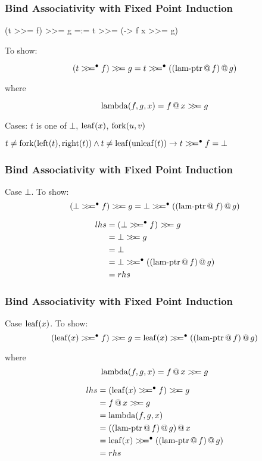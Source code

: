 \documentclass[serif,professionalfont]{beamer}
\begin{document}
\newcommand\lamptr[2]{(\appp{\app{\ptr{lam}}{#1}}{#2})}

\begin{frame}[fragile]
\frametitle{Bind Associativity with Fixed Point Induction}

\begin{code}
(t >>= f) >>= g =:= t >>= (\x -> f x >>= g)
\end{code}


To show:

$$\bind{(\bindb{t}{f})}{g} = \bindb{t}{\lamptr{f}{g}}$$

where

$$\mathrm{lambda}(f,g,x) = f \, @ \, x >\!\!>\!\!= g$$

\pause

\vspace{2\baselineskip}

Cases: $t$ is one of $\bot$, $\mathrm{leaf}(x)$, $\mathrm{fork}(u,v)$
\pause

\vspace{2\baselineskip}

$t \neq \mathrm{fork}(\mathrm{left}(t),\mathrm{right}(t)) \wedge t \neq\mathrm{leaf}(\mathrm{unleaf}(t)) \rightarrow t >\!\!>\!\!=^{\bullet} f = \bot$

\end{frame}

\begin{frame}[fragile]
\frametitle{Bind Associativity with Fixed Point Induction}

Case $\bot$. To show:
$$\bind{(\bindb{\bot}{f})}{g} = \bindb{\bot}{\lamptr{f}{g}}$$

\begin{align*}
lhs = & \; \bind{(\bindb{\bot}{f})}{g} \\
    = & \; \bind{\bot}{g}              \\
    = & \; \bot                        \\
    = & \; \bindb{\bot}{\lamptr{f}{g}} \\
    = & \; rhs
\end{align*}

\end{frame}

\begin{frame}[fragile]
\frametitle{Bind Associativity with Fixed Point Induction}

Case $\mathrm{leaf}(x)$. To show:
$$\bind{(\bindb{\leaf{x}}{f})}{g} = \bindb{\leaf{x}}{\lamptr{f}{g}}$$

where
$$\mathrm{lambda}(f,g,x) = f \, @ \, x >\!\!>\!\!= g$$

\begin{align*}
lhs = & \; \bind{(\bindb{\leaf{x}}{f})}{g} \\
    = & \; \bind{\app{f}{x}}{g}            \\
    = & \; \fn{lambda}(f,g,x)              \\
    = & \; \app{\lamptr{f}{g}}{x}          \\
    = & \; \bindb{\leaf{x}}{\lamptr{f}{g}} \\
    = & \; rhs
\end{align*}

\end{frame}
\end{document}
